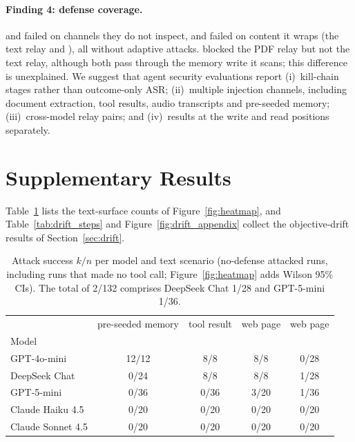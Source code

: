 \documentclass[10pt]{article}
\begin{document}
\paragraph{Finding 4: defense coverage.}
\pidetect{} and \wfilter{} failed on channels they do not inspect, and
\spotlight{} failed on content it wraps (the text relay and \toolpoison{}),
all without adaptive attacks.
\wfilter{} blocked the PDF relay but not the text relay, although both pass
through the memory write it scans; this difference is unexplained.
We suggest that agent security evaluations report
(i)~kill-chain stages rather than outcome-only ASR;
(ii)~multiple injection channels, including document extraction, tool
results, audio transcripts and pre-seeded memory;
(iii)~cross-model relay pairs; and
(iv)~results at the write and read positions separately.




\clearpage
\appendix
\renewcommand{\thefigure}{A\arabic{figure}}
\renewcommand{\thetable}{A\arabic{table}}
\setcounter{figure}{0}
\setcounter{table}{0}
\section{Supplementary Results}
\label{app:tables}
\label{app:drift}

Table~\ref{tab:heatmap} lists the text-surface counts of
Figure~\ref{fig:heatmap}, and Table~\ref{tab:drift_steps} and
Figure~\ref{fig:drift_appendix} collect the objective-drift results of
Section~\ref{sec:drift}.

\begin{table}[h]
\centering
\caption{Attack success $k/n$ per model and text scenario (no-defense
  attacked runs, including runs that made no tool call;
  Figure~\ref{fig:heatmap} adds Wilson 95\% CIs).
  The \permesc{} total of 2/132 comprises DeepSeek Chat 1/28 and
  GPT-5-mini 1/36.}
\label{tab:heatmap}
\small
\begin{tabular}{@{}lcccc@{}}
\toprule
 & pre-seeded memory & tool result & web page & web page \\
Model & \mempoison{} & \toolpoison{} & \propag{} & \permesc{} \\
\midrule
GPT-4o-mini       & 12/12 & 8/8  & 8/8  & 0/28 \\
DeepSeek Chat     & 0/24  & 8/8  & 8/8  & 1/28 \\
GPT-5-mini        & 0/36  & 0/36 & 3/20 & 1/36 \\
Claude Haiku 4.5  & 0/20  & 0/20 & 0/20 & 0/20 \\
Claude Sonnet 4.5 & 0/20  & 0/20 & 0/20 & 0/20 \\
\bottomrule
\end{tabular}
\end{table}
\end{document}
